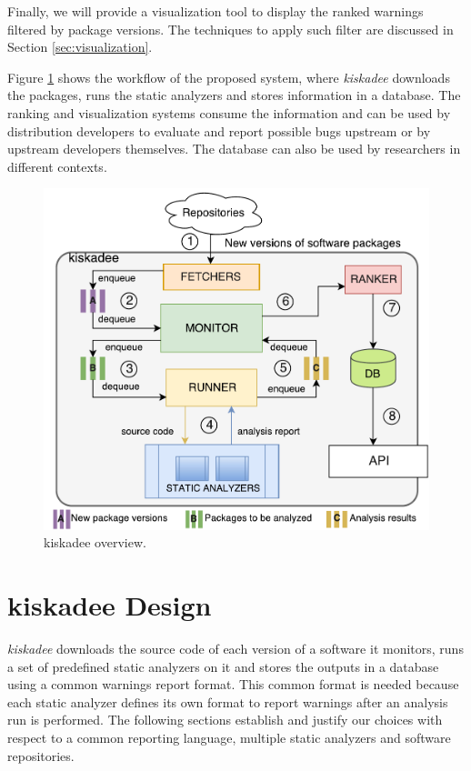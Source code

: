 Finally, we will provide a visualization tool to display the ranked warnings
filtered by package versions. The techniques to apply such filter are discussed
in Section \ref{sec:visualization}.

Figure \ref{fig:kiskadee_overview} shows the workflow of the proposed system,
where \textit{kiskadee} downloads the packages, runs the static analyzers and
stores information in a database. The ranking and visualization systems consume
the information and can be used by distribution developers to evaluate and
report possible bugs upstream or by upstream developers
themselves. The database can also be used by researchers in different contexts.

\begin{figure}[!h]
  \centering
  \includegraphics[width=.95\textwidth]{figures/kiskadee-overview} 
  \caption{kiskadee overview.}
  \label{fig:kiskadee_overview} 
\end{figure}

\section{kiskadee Design}
\label{sec:kiskadee}

\textit{kiskadee} downloads the source code of each version of a software it
monitors, runs a set of predefined static analyzers on it and stores the
outputs in a database using a common warnings report format. This common format
is needed because each static analyzer defines its own format to report
warnings after an analysis run is performed. The following sections establish
and justify our choices with respect to a common reporting language, multiple
static analyzers and software repositories.

